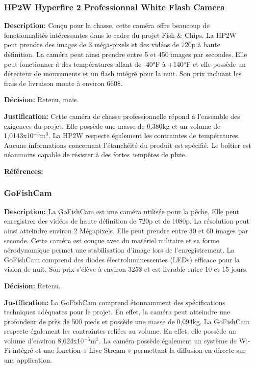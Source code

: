 \subsubsection{HP2W Hyperfire 2 Professionnal White Flash Camera}
\label{subsubsectionHyperfire}

\textbf{Description:} Conçu pour la chasse, cette caméra offre beaucoup de fonctionnalités intéressantes dans le cadre du projet Fish \& Chips. La HP2W peut prendre des images de 3 méga-pixels et des vidéos de 720p à haute définition. La caméra peut ainsi prendre entre 5 et 450 images par secondes. Elle peut fonctionner à des températures allant de -40°F à +140°F et elle possède un détecteur de mouvements et un flash intégré pour la nuit. Son prix incluant les frais de livraison monte à environ 660\$.

\textbf{Décision:} Retenu, mais.

\textbf{Justification:} Cette caméra de chasse professionnelle répond à l'ensemble des exigences du projet. Elle possède une masse de 0,380kg et un volume de 1,0143x10$^{-3}$m$^3$. La HP2W respecte également les contraintes de températures. Aucune informations concernant l'étanchéité du produit est spécifié. Le boîtier est néanmoins capable de résister à des fortes tempêtes de pluie.

\textbf{Références:} \cite{HP2W}


\subsubsection{GoFishCam}

\textbf{Description:} La GoFishCam est une caméra utilisée pour la pêche. Elle peut enregistrer des vidéos de haute définition de 720p et de 1080p. La résolution peut ainsi atteindre environ 2 Mégapixels. Elle peut prendre entre 30 et 60 images par seconde. Cette caméra est conçue avec du matériel militaire et sa forme aérodynamique permet une stabilisation d'image lors de l'enregistrement. La GoFishCam comprend des diodes électroluminescentes (LEDs) efficace pour la vision de nuit. Son prix s'élève à environ 325\$ et est livrable entre 10 et 15 jours.

\textbf{Décision:} Retenu.

\textbf{Justification:} La GoFishCam comprend étonnamment des spécifications techniques adéquates pour le projet. En effet, la caméra peut atteindre une profondeur de près de 500 pieds et possède une masse de 0,094kg. La GoFishCam respecte également les contraintes reliées au volume. En effet, elle possède un volume d'environ 8,624x10$^{-5}$m$^3$. La caméra possède également un système de Wi-Fi intégré et une fonction « Live Stream » permettant la diffusion en directe sur une application.

